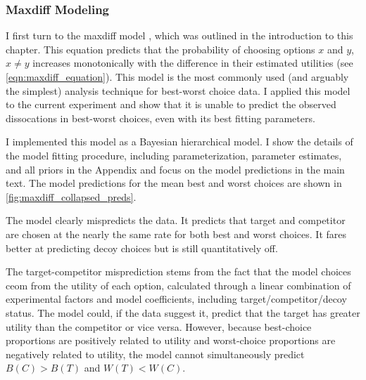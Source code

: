 \subsubsection{Maxdiff Modeling}

I first turn to the maxdiff model \parencite{marleyProbabilisticModelsBest2005}, which was outlined in the introduction to this chapter. This equation predicts that the probability of choosing options $x$ and $y$, $x \neq y$ increases monotonically with the difference in their estimated utilities (see \ref{eqn:maxdiff_equation}). This model is the most commonly used (and arguably the simplest) analysis technique for best-worst choice data. I applied this model to the current experiment and show that it is unable to predict the observed dissocations in best-worst choices, even with its best fitting parameters.

I implemented this model as a Bayesian hierarchical model. I show the details of the model fitting procedure, including parameterization, parameter estimates, and all priors in the Appendix and focus on the model predictions in the main text. The model predictions for the mean best and worst choices are shown in \ref{fig:maxdiff_collapsed_preds}.

The model clearly mispredicts the data. It predicts that target and competitor are chosen at the nearly the same rate for both best and worst choices. It fares better at predicting decoy choices but is still quantitatively off.

The target-competitor misprediction stems from the fact that the model choices ceom from the utility of each option, calculated through a linear combination of experimental factors and model coefficients, including target/competitor/decoy status. The model could, if the data suggest it, predict that the target has greater utility than the competitor or vice versa. However, because best-choice proportions are positively related to utility and worst-choice proportions are negatively related to utility, the model cannot simultaneously predict $B(C)>B(T)$ and $W(T)<W(C)$. 

